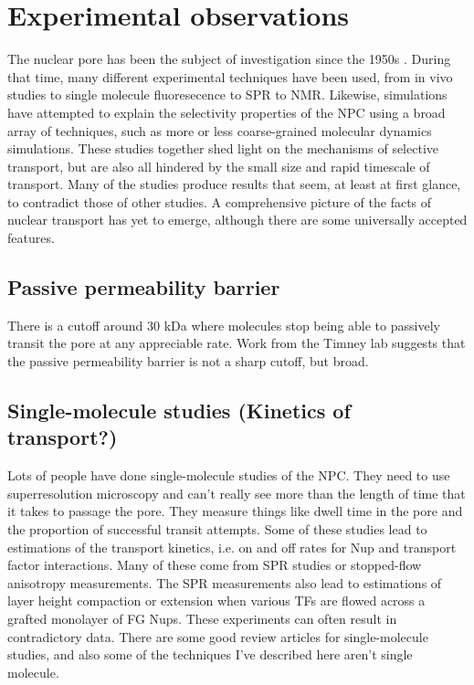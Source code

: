 \section{Experimental observations} 
The nuclear pore has been the subject of investigation since the 1950s \cite{hapensomething16 or another review article with timeline}.  During that time, many different experimental techniques have been used, from in vivo studies to single molecule fluoresecence to SPR to NMR.  Likewise, simulations have attempted to explain the selectivity properties of the NPC using a broad array of techniques, such as more or less coarse-grained molecular dynamics simulations.  These studies together shed light on the mechanisms of selective transport, but are also all hindered by the small size and rapid timescale of transport.  Many of the studies produce results that seem, at least at first glance, to contradict those of other studies.  A comprehensive picture of the facts of nuclear transport has yet to emerge, although there are some universally accepted features.
\subsection{Passive permeability barrier}
There is a cutoff around 30 kDa where molecules stop being able to passively transit the pore at any appreciable rate.  Work from the Timney lab suggests that the passive permeability barrier is not a sharp cutoff, but broad.
\subsection{Single-molecule studies (Kinetics of transport?)}
Lots of people have done single-molecule studies of the NPC.  They need to use superresolution microscopy and can't really see more than the length of time that it takes to passage the pore.  They measure things like dwell time in the pore and the proportion of successful transit attempts.  Some of these studies lead to estimations of the transport kinetics, i.e. on and off rates for Nup and transport factor interactions.  Many of these come from SPR studies or stopped-flow anisotropy measurements.  The SPR measurements also lead to estimations of layer height compaction or extension when various TFs are flowed across a grafted monolayer of FG Nups.  These experiments can often result in contradictory data.  There are some good review articles for single-molecule studies, and also some of the techniques I've described here aren't single molecule.
